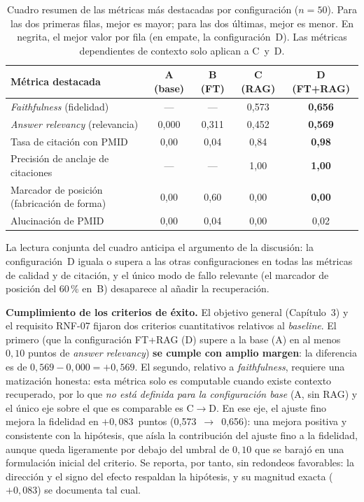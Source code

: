 \documentclass[11pt,a4paper,spanish]{book}
\numberwithin{equation}{chapter}
\numberwithin{figure}{chapter}
\begin{document}
\begin{table}[h]
\centering
\small
\setlength{\tabcolsep}{3pt}
\renewcommand{\arraystretch}{1.15}
\begin{tabular}{|p{}|c|c|c|c|}
\hline
\textbf{Métrica destacada} & \textbf{A (base)} & \textbf{B (FT)} & \textbf{C (RAG)} & \textbf{D (FT+RAG)} \\
\hline
\textit{Faithfulness} (fidelidad)        & ---    & ---    & 0{,}573 & \textbf{0{,}656} \\
\hline
\textit{Answer relevancy} (relevancia)   & 0{,}000 & 0{,}311 & 0{,}452 & \textbf{0{,}569} \\
\hline
Tasa de citación con PMID                & 0{,}00 & 0{,}04 & 0{,}84  & \textbf{0{,}98} \\
\hline
Precisión de anclaje de citaciones       & ---    & ---    & 1{,}00  & \textbf{1{,}00} \\
\hline
Marcador de posición (fabricación de forma) & 0{,}00 & 0{,}60 & 0{,}00 & \textbf{0{,}00} \\
\hline
Alucinación de PMID                      & 0{,}00 & 0{,}04 & 0{,}00 & 0{,}02 \\
\hline
\end{tabular}
\caption{Cuadro resumen de las métricas más destacadas por configuración ($n=50$). Para las dos primeras filas, mejor es mayor; para las dos últimas, mejor es menor. En negrita, el mejor valor por fila (en empate, la configuración~D). Las métricas dependientes de contexto solo aplican a C~y~D.}
\label{tab:c6_resumen}
\end{table}

La lectura conjunta del cuadro anticipa el argumento de la discusión: la configuración~D iguala o supera a las otras configuraciones en todas las métricas de calidad y de citación, y el único modo de fallo relevante (el marcador de posición del 60\,\% en~B) desaparece al añadir la recuperación.

\textbf{Cumplimiento de los criterios de éxito.} El objetivo general (Capítulo~3) y el requisito RNF-07 fijaron dos criterios cuantitativos relativos al \textit{baseline}. El primero (que la configuración FT+RAG (D) supere a la base (A) en al menos $0{,}10$ puntos de \textit{answer relevancy}) \textbf{se cumple con amplio margen}: la diferencia es de $0{,}569 - 0{,}000 = +0{,}569$. El segundo, relativo a \textit{faithfulness}, requiere una matización honesta: esta métrica solo es computable cuando existe contexto recuperado, por lo que \emph{no está definida para la configuración base} (A, sin RAG) y el único eje sobre el que es comparable es C$\to$D. En ese eje, el ajuste fino mejora la fidelidad en $+0{,}083$~puntos (0{,}573~$\to$~0{,}656): una mejora positiva y consistente con la hipótesis, que aísla la contribución del ajuste fino a la fidelidad, aunque queda ligeramente por debajo del umbral de $0{,}10$ que se barajó en una formulación inicial del criterio. Se reporta, por tanto, sin redondeos favorables: la dirección y el signo del efecto respaldan la hipótesis, y su magnitud exacta ($+0{,}083$) se documenta tal cual.
\end{document}
